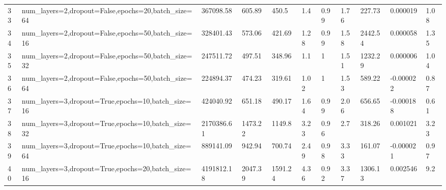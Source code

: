 \begin{longtable}{C{0.8cm} L{2cm} C{1.15cm} C{1.15cm} C{1.15cm} C{1.15cm} C{0.85cm} C{1.25cm} C{1.2cm} C{1.5cm} C{1.0cm}}
33 & num\_layers=2,\newline dropout=False,\newline epochs=20,\newline batch\_size=64 & 367098.58 & 605.89 & 450.5 & 1.4 & 0.99 & 1.76 & 227.73 & 0.000019 & 1.08 \\
34 & num\_layers=2,\newline dropout=False,\newline epochs=50,\newline batch\_size=16 & 328401.43 & 573.06 & 421.69 & 1.28 & 0.99 & 1.58 & 2442.54 & 0.000058 & 1.35 \\
35 & num\_layers=2,\newline dropout=False,\newline epochs=50,\newline batch\_size=32 & 247511.72 & 497.51 & 348.96 & 1.1 & 1 & 1.51 & 1232.29 & 0.000006 & 1.04 \\
36 & num\_layers=2,\newline dropout=False,\newline epochs=50,\newline batch\_size=64 & 224894.37 & 474.23 & 319.61 & 1.02 & 1 & 1.53 & 589.22 & -0.000022 & 0.87 \\
37 & num\_layers=3,\newline dropout=True,\newline epochs=10,\newline batch\_size=16 & 424040.92 & 651.18 & 490.17 & 1.64 & 0.99 & 2.06 & 656.65 & -0.000188 & 0.61 \\
38 & num\_layers=3,\newline dropout=True,\newline epochs=10,\newline batch\_size=32 & 2170386.61 & 1473.22 & 1149.8 & 3.23 & 0.96 & 2.7 & 318.26 & 0.001021 & 3.23 \\
39 & num\_layers=3,\newline dropout=True,\newline epochs=10,\newline batch\_size=64 & 889141.09 & 942.94 & 700.74 & 2.49 & 0.98 & 3.33 & 161.07 & -0.000021 & 0.97 \\
40 & num\_layers=3,\newline dropout=True,\newline epochs=20,\newline batch\_size=16 & 4191812.18 & 2047.39 & 1591.24 & 4.36 & 0.92 & 3.37 & 1306.13 & 0.002546 & 9.2 \\

\end{longtable}
